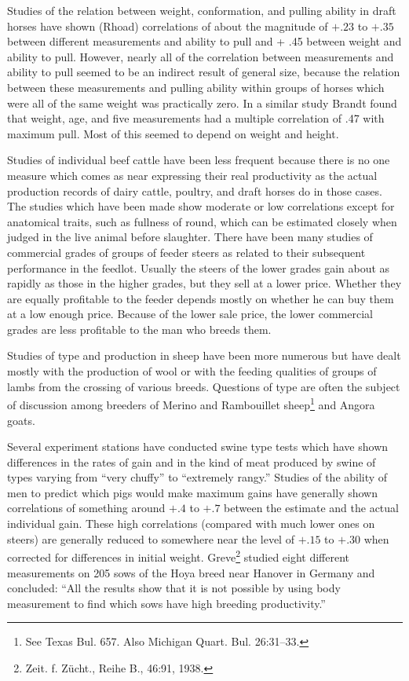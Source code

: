 Studies of the relation between weight, conformation, and pulling
ability in draft horses have shown (Rhoad) correlations of about the
magnitude of $+ .23$ to $+ .35$ between different measurements and ability
to pull and + .45 between weight and ability to pull. However,
nearly all of the correlation between measurements and ability to pull
seemed to be an indirect result of general size, because the relation
between these measurements and pulling ability within groups of
horses which were all of the same weight was practically zero. In a similar
study Brandt found that weight, age, and five measurements had a
multiple correlation of .47 with maximum pull. Most of this seemed to
depend on weight and height.

Studies of individual beef cattle have been less frequent because
there is no one measure which comes as near expressing their real productivity
as the actual production records of dairy cattle, poultry, and
draft horses do in those cases. The studies which have been made show
moderate or low correlations except for anatomical traits, such as fullness
of round, which can be estimated closely when judged in the live
animal before slaughter. There have been many studies of commercial
grades of groups of feeder steers as related to their subsequent performance
in the feedlot. Usually the steers of the lower grades gain about as
rapidly as those in the higher grades, but they sell at a lower price.
Whether they are equally profitable to the feeder depends mostly on
whether he can buy them at a low enough price. Because of the lower
sale price, the lower commercial grades are less profitable to the
man who breeds them.

Studies of type and production in sheep have been more numerous
but have dealt mostly with the production of wool or with the feeding
qualities of groups of lambs from the crossing of various breeds. Questions
of type are often the subject of discussion among breeders of Merino
and Rambouillet sheep\footnote{See Texas Bul. 657. Also Michigan Quart.
Bul. 26:31--33.} and Angora goats.

Several experiment stations have conducted swine type tests which
have shown differences in the rates of gain and in the kind of meat produced
by swine of types varying from ``very chuffy'' to ``extremely
rangy.'' Studies of the ability of men to predict which pigs would make
maximum gains have generally shown correlations of something
around $+ .4$ to $+ .7$ between the estimate and the actual individual
gain. These high correlations (compared with much lower ones on
steers) are generally reduced to somewhere near the level of $+ .15$
to $+ .30$ when corrected for differences in initial weight.
Greve\footnote{Zeit. f. Z\"ucht., Reihe B., 46:91, 1938.} studied
eight different measurements on 205 sows of the Hoya breed near Hanover
in Germany and concluded: ``All the results show that it is not
possible by using body measurement to find which sows have high
breeding productivity.''

